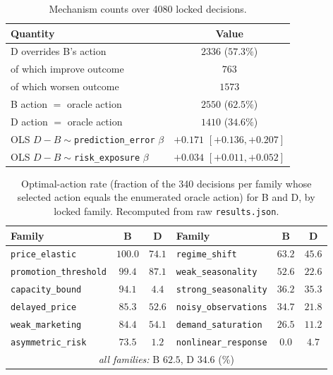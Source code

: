\documentclass[conference]{IEEEtran}
\newcommand{\code}[1]{\texttt{#1}}
\newcommand{\dvb}{\ensuremath{D\!-\!B}}
\begin{document}
\begin{table}[!t]
\caption{Mechanism counts over 4080 locked decisions.}
\label{tab:mech}
\centering
\begin{tabular}{lc}
\toprule
Quantity & Value \\
\midrule
D overrides B's action              & $2336$ ($57.3\%$) \\
\quad of which improve outcome      & $763$ \\
\quad of which worsen outcome       & $1573$ \\
B action $=$ oracle action          & $2550$ ($62.5\%$) \\
D action $=$ oracle action          & $1410$ ($34.6\%$) \\
OLS $\dvb\sim$\code{prediction\_error} $\beta$ & $+0.171$ $[+0.136,+0.207]$ \\
OLS $\dvb\sim$\code{risk\_exposure} $\beta$    & $+0.034$ $[+0.011,+0.052]$ \\
\bottomrule
\end{tabular}
\end{table}

\begin{table}[!t]
\caption{Optimal-action rate (fraction of the 340 decisions per family whose
selected action equals the enumerated oracle action) for B and D, by locked
family. Recomputed from raw \code{results.json}.}
\label{tab:optaction}
\centering
\begin{tabular}{lcc|lcc}
\toprule
Family & B & D & Family & B & D \\
\midrule
\code{price\_elastic}      & $100.0$ & $74.1$ & \code{regime\_shift}      & $63.2$ & $45.6$ \\
\code{promotion\_threshold}& $99.4$  & $87.1$ & \code{weak\_seasonality}  & $52.6$ & $22.6$ \\
\code{capacity\_bound}     & $94.1$  & $4.4$  & \code{strong\_seasonality}& $36.2$ & $35.3$ \\
\code{delayed\_price}      & $85.3$  & $52.6$ & \code{noisy\_observations}& $34.7$ & $21.8$ \\
\code{weak\_marketing}     & $84.4$  & $54.1$ & \code{demand\_saturation} & $26.5$ & $11.2$ \\
\code{asymmetric\_risk}    & $73.5$  & $1.2$  & \code{nonlinear\_response}& $0.0$  & $4.7$  \\
\midrule
\multicolumn{6}{c}{\emph{all families:} B $62.5$, D $34.6$ (\%)} \\
\bottomrule
\end{tabular}
\end{table}
\end{document}
